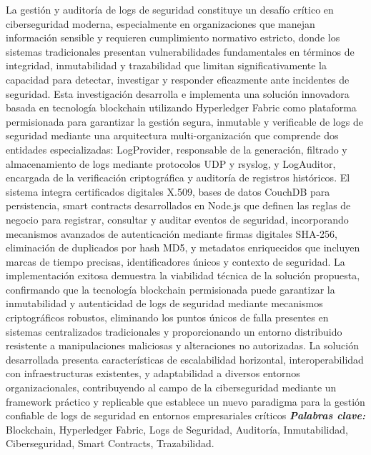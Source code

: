 
\noindent
La gestión y auditoría de logs de seguridad constituye un desafío crítico en ciberseguridad moderna, especialmente en organizaciones que manejan información sensible y requieren cumplimiento normativo estricto, donde los sistemas tradicionales presentan vulnerabilidades fundamentales en términos de integridad, inmutabilidad y trazabilidad que limitan significativamente la capacidad para detectar, investigar y responder eficazmente ante incidentes de seguridad. Esta investigación desarrolla e implementa una solución innovadora basada en tecnología blockchain utilizando Hyperledger Fabric como plataforma permisionada para garantizar la gestión segura, inmutable y verificable de logs de seguridad mediante una arquitectura multi-organización que comprende dos entidades especializadas: LogProvider, responsable de la generación, filtrado y almacenamiento de logs mediante protocolos UDP y rsyslog, y LogAuditor, encargada de la verificación criptográfica y auditoría de registros históricos. El sistema integra certificados digitales X.509, bases de datos CouchDB para persistencia, smart contracts desarrollados en Node.js que definen las reglas de negocio para registrar, consultar y auditar eventos de seguridad, incorporando mecanismos avanzados de autenticación mediante firmas digitales SHA-256, eliminación de duplicados por hash MD5, y metadatos enriquecidos que incluyen marcas de tiempo precisas, identificadores únicos y contexto de seguridad. La implementación exitosa demuestra la viabilidad técnica de la solución propuesta, confirmando que la tecnología blockchain permisionada puede garantizar la inmutabilidad y autenticidad de logs de seguridad mediante mecanismos criptográficos robustos, eliminando los puntos únicos de falla presentes en sistemas centralizados tradicionales y proporcionando un entorno distribuido resistente a manipulaciones maliciosas y alteraciones no autorizadas. La solución desarrollada presenta características de escalabilidad horizontal, interoperabilidad con infraestructuras existentes, y adaptabilidad a diversos entornos organizacionales, contribuyendo al campo de la ciberseguridad mediante un framework práctico y replicable que establece un nuevo paradigma para la gestión confiable de logs de seguridad en entornos empresariales críticos
\vspace{10pt}
\noindent\textbf{\emph{Palabras clave:}} {Blockchain, Hyperledger Fabric, Logs de Seguridad, Auditoría, Inmutabilidad, Ciberseguridad, Smart Contracts, Trazabilidad.}
